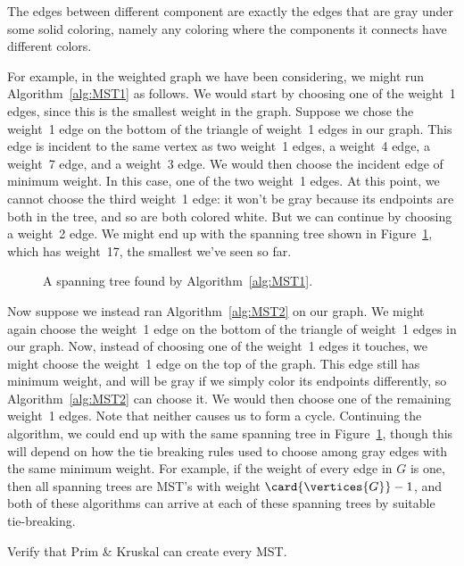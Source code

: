 The edges between different component are exactly the edges that are
gray under some solid coloring, namely any coloring where the
components it connects have different colors.

For example, in the weighted graph we have been considering, we might
run Algorithm~\ref{alg:MST1} as follows.  We would start by choosing
one of the weight~1 edges, since this is the smallest weight in the
graph.  Suppose we chose the weight~1 edge on the bottom of the
triangle of weight~1 edges in our graph.  This edge is incident to the
same vertex as two weight~1 edges, a weight~4 edge, a weight~7 edge,
and a weight~3 edge.  We would then choose the incident edge of
minimum weight.  In this case, one of the two weight~1 edges.  At this
point, we cannot choose the third weight~1 edge: it won't be gray
because its endpoints are both in the tree, and so are both colored
white.  But we can continue by choosing a weight~2 edge.  We might end
up with the spanning tree shown in Figure~\ref{fig:5KC}, which has
weight~17, the smallest we've seen so far.

\begin{figure}


\caption{A spanning tree found by Algorithm~\ref{alg:MST1}.}

\label{fig:5KC}

\end{figure}

Now suppose we instead ran Algorithm~\ref{alg:MST2} on our graph.  We
might again choose the weight~1 edge on the bottom of the triangle of
weight~1 edges in our graph.  Now, instead of choosing one of the
weight~1 edges it touches, we might choose the weight~1 edge on the
top of the graph.  This edge still has minimum weight, and will be
gray if we simply color its endpoints differently, so
Algorithm~\ref{alg:MST2} can choose it.  We would then choose one of
the remaining weight~1 edges.  Note that neither causes us to form a
cycle.  Continuing the algorithm, we could end up with the same
spanning tree in Figure~\ref{fig:5KC}, though this will depend on how
the tie breaking rules used to choose among gray edges with the same
minimum weight.  For example, if the weight of every edge in $G$ is
one, then all spanning trees are MST's with weight
$\card{\vertices{G}}-1$, and both of these algorithms can arrive at
each of these spanning trees by suitable tie-breaking.

\begin{editingnotes}
Verify that Prim \& Kruskal can create every MST.
\end{editingnotes}

